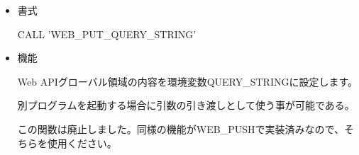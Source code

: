 
\begin{itemize}
\item{書式}

CALL 'WEB\_PUT\_QUERY\_STRING'

\item{機能}

Web APIグローバル領域の内容を環境変数QUERY\_STRINGに設定します。

別プログラムを起動する場合に引数の引き渡しとして使う事が可能である。

この関数は廃止しました。同様の機能がWEB\_PUSHで実装済みなので、そちらを使用ください。

\end{itemize}
